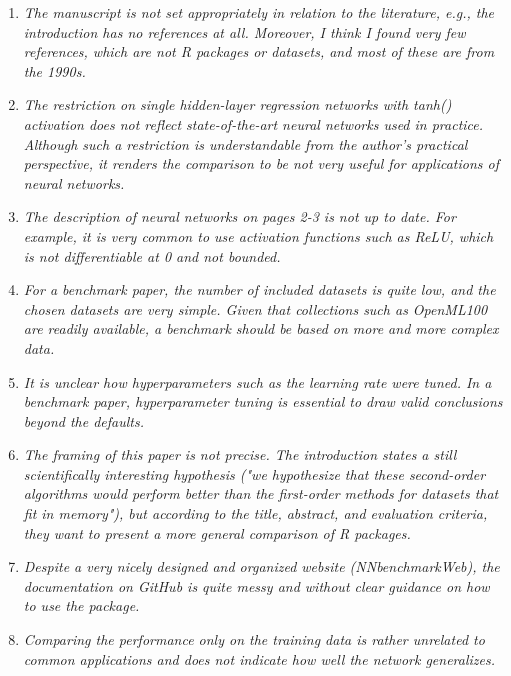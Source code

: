 \documentclass[12pt]{article}
\begin{document}
\begin{enumerate}
\item \textit{The manuscript is not set appropriately in relation to the literature, e.g., the introduction has no references at all. Moreover, I think I found very few references, which are not R packages or datasets, and most of these are from the 1990s.}

\textbf{}


\item \textit{The restriction on single hidden-layer regression networks with tanh() activation does not reflect state-of-the-art neural networks used in practice. Although such a restriction is understandable from the author’s practical perspective, it renders the comparison to be not very useful for applications of neural networks.}

\textbf{}


\item \textit{The description of neural networks on pages 2-3 is not up to date. For example, it is very common to use activation functions such as ReLU, which is not differentiable at 0 and not bounded.}

\textbf{}


\item \textit{For a benchmark paper, the number of included datasets is quite low, and the chosen datasets are very simple. Given that collections such as OpenML100 are readily available, a benchmark should be based on more and more complex data.}

\textbf{}


\item \textit{It is unclear how hyperparameters such as the learning rate were tuned. In a benchmark paper, hyperparameter tuning is essential to draw valid conclusions beyond the defaults.}

\textbf{}


\item \textit{The framing of this paper is not precise. The introduction states a still scientifically interesting hypothesis ("we hypothesize that these second-order algorithms would perform better than the first-order methods for datasets that fit in memory"), but according to the title, abstract, and evaluation criteria, they want to present a more general comparison of R packages.}

\textbf{}


\item \textit{Despite a very nicely designed and organized website (NNbenchmarkWeb), the documentation on GitHub is quite messy and without clear guidance on how to use the package.}

\textbf{}


\item \textit{Comparing the performance only on the training data is rather unrelated to common applications and does not indicate how well the network generalizes.}

\textbf{}

\end{enumerate}
\end{document}
